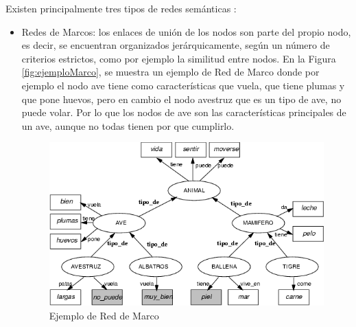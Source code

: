 
Existen principalmente tres tipos de redes semánticas \citep{tiposRedesSemanticas}:
\begin{itemize}
	\item Redes de Marcos: los enlaces de unión de los nodos son parte del propio nodo, es decir, se encuentran organizados jerárquicamente, según un número de criterios estrictos, como por ejemplo la similitud entre nodos. En la Figura \ref{fig:ejemploMarco}, se muestra un ejemplo de Red de Marco donde por ejemplo el nodo ave tiene como características  que vuela, que tiene plumas y que pone huevos, pero en cambio el nodo avestruz que es un tipo de ave, no puede volar. Por lo que los nodos de ave son las características principales de un ave, aunque no todas tienen por que cumplirlo.
	\begin{figure}[!h]
		\includegraphics[width=.9\textwidth]{Imagenes/Bitmap/Capitulo2/ejemploRedMarco.png}
		\caption{Ejemplo de Red de Marco}
		\label{fig:ejemploIsa}
	\end{figure}
	

\end{itemize}

